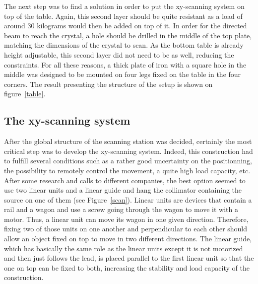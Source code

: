 \documentclass[11pt,a4paper]{article}
\begin{document}
The next step was to find a solution in order to put the xy-scanning system on top of the table. Again, this second layer should be quite resistant as a load of around 30 kilograms would then be added on top of it. In order for the directed beam to reach the crystal, a hole should be drilled in the middle of the top plate, matching the dimensions of the crystal to scan. As the bottom table is already height adjustable, this second layer did not need to be as well, reducing the constraints. For all these reasons, a thick plate of iron with a square hole in the middle was designed to be mounted on four legs fixed on the table in the four corners. The result presenting the structure of the setup is shown on figure~\ref{table}.

\subsection{The xy-scanning system} \label{x-y}

After the global structure of the scanning station was decided, certainly the most critical step was to develop the xy-scanning system. Indeed, this construction had to fulfill several conditions such as a rather good uncertainty on the positionning, the possibility to remotely control the movement, a quite high load capacity, etc. After some research and calls to different companies, the best option seemed to use two linear units and a linear guide and hang the collimator containing the source on one of them (see Figure~\ref{scan}). Linear units are devices that contain a rail and a wagon and use a screw going through the wagon to move it with a motor. Thus, a linear unit can move its wagon in one given direction. Therefore, fixing two of those units on one another and perpendicular to each other should allow an object fixed on top to move in two different directions. The linear guide, which has basically the same role as the linear units except it is not motorized and then just follows the lead, is placed parallel to the first linear unit so that the one on top can be fixed to both, increasing the stability and load capacity of the construction.
\end{document}
